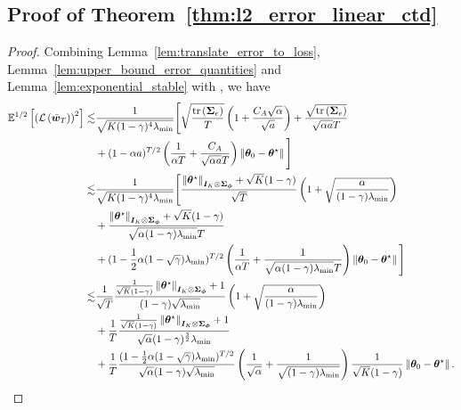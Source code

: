 \subsection{Proof of Theorem~\ref{thm:l2_error_linear_ctd}}\label{appendix:proof_l2_error_linear_ctd}
\begin{proof}
Combining Lemma~\ref{lem:translate_error_to_loss}, Lemma~\ref{lem:upper_bound_error_quantities} and Lemma~\ref{lem:exponential_stable} with \citep[Theorem~1][]{samsonov2024improved}, we have
    \begin{equation*}
       \begin{aligned}
        {\mathbb E}^{1/2}\left[{\left({{\mathcal{L}}\left({\bar{{\bm{w}}}_T}\right)}\right)^2}\right]\lesssim& \frac{1}{\sqrt{K(1-\gamma)^4\lambda_{\min}}}\Bigg[\sqrt{\frac{\operatorname{tr}\left({{\bm{\Sigma}}_e}\right)}{T}}\left({1+\frac{C_A\sqrt{\alpha}}{\sqrt{a}}}\right)+\frac{\sqrt{\operatorname{tr}\left({{\bm{\Sigma}}_e}\right)}}{\sqrt{\alpha a}T}\\
        &+(1-\alpha a)^{T/2}\left({\frac{1}{\alpha T}+\frac{C_A}{\sqrt{\alpha a}T}}\right)\left\|{{\bm{\theta}}_0-{\bm{\theta}}^{\star}}\right\| \Bigg]\\
        \lesssim&\frac{1}{\sqrt{K(1-\gamma)^4\lambda_{\min}}}\Bigg[\frac{\left\|{{\bm{\theta}}^{\star}}\right\|_{{\bm{I}}_K\otimes{\bm{\Sigma}}_{{\bm{\phi}}}}+\sqrt{K}(1-\gamma)}{\sqrt{T}}\left({1+\sqrt{\frac{\alpha}{(1-\gamma)\lambda_{\min}}}}\right)\\
        &+\frac{\left\|{{\bm{\theta}}^{\star}}\right\|_{{\bm{I}}_K\otimes{\bm{\Sigma}}_{{\bm{\phi}}}}+\sqrt{K}(1-\gamma)}{\sqrt{\alpha (1-\gamma)\lambda_{\min}}T}\\
        &+(1-\frac{1}{2}\alpha (1-\sqrt\gamma)\lambda_{\min} )^{T/2}\left({\frac{1}{\alpha T}+\frac{1}{\sqrt{\alpha (1-\gamma)\lambda_{\min}}T}}\right)\left\|{{\bm{\theta}}_0-{\bm{\theta}}^{\star}}\right\| \Bigg]\\
        \lesssim&\frac{1}{\sqrt{T}}\frac{\frac{1}{\sqrt{K}(1-\gamma)}\left\|{{\bm{\theta}}^{\star}}\right\|_{{\bm{I}}_K\otimes{\bm{\Sigma}}_{{\bm{\phi}}}}+1}{(1-\gamma)\sqrt{\lambda_{\min}}}\left({1+\sqrt{\frac{\alpha}{(1-\gamma)\lambda_{\min}}}}\right)\\
        &+\frac{1}{T}\frac{\frac{1}{\sqrt{K}(1-\gamma)}\left\|{{\bm{\theta}}^{\star}}\right\|_{{\bm{I}}_K\otimes{\bm{\Sigma}}_{{\bm{\phi}}}}+1}{\sqrt{\alpha }(1-\gamma)^{\frac{3}{2}}\lambda_{\min}}\\
        &+\frac{1}{T}\frac{(1-\frac{1}{2}\alpha (1-\sqrt\gamma)\lambda_{\min} )^{T/2}}{ \sqrt{\alpha}(1-\gamma)\sqrt{\lambda_{\min}}}\left({\frac{1}{\sqrt\alpha}+\frac{1}{\sqrt{ (1-\gamma)\lambda_{\min}}}}\right)\frac{1}{\sqrt{K}(1-\gamma)}\left\|{{\bm{\theta}}_0-{\bm{\theta}}^{\star}}\right\|.
       \end{aligned}
    \end{equation*}
\end{proof}


